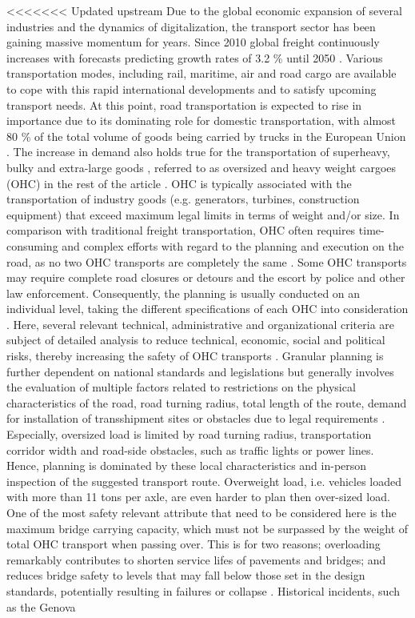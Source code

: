 
<<<<<<< Updated upstream
Due to the global economic expansion of several industries and the dynamics of digitalization, the transport sector has been gaining massive momentum for years. Since 2010 global freight continuously increases with forecasts predicting growth rates of 3.2 \% until 2050 \cite{figura2020preferences, InternationalTransportForum}. Various transportation modes, including rail, maritime, air and road cargo are available to cope with this rapid international developments and to satisfy upcoming transport needs. At this point, road transportation is expected to rise in importance due to its dominating role for domestic transportation, with almost 80 \% of the total volume of goods being carried by trucks in the European Union \cite{Eurostat}. The increase in demand also holds true for the transportation of superheavy, bulky and extra-large goods \cite{gavrilova2021analysis}, referred to as oversized and heavy weight cargoes (OHC) in the rest of the article \cite{Luo.2021}. OHC is typically associated with the transportation of industry goods (e.g. generators, turbines, construction equipment) that exceed maximum legal limits in terms of weight and/or size. In comparison with traditional freight transportation, OHC often requires time-consuming and complex efforts with regard to the planning and execution on the road, as no two OHC transports are completely the same \cite{Wolnowska.2019}. Some OHC transports may require complete road closures or detours and the escort by police and other law enforcement. Consequently, the planning is usually conducted on an individual level, taking the different specifications of each OHC into consideration \cite{Bazaras.2013}. Here, several relevant technical, administrative and organizational criteria are subject of detailed analysis to reduce technical, economic, social and political risks, thereby increasing the safety of OHC transports \cite{Palsaitis.2012}. Granular planning is further dependent on national standards and legislations but generally involves the evaluation of multiple factors related to restrictions on the physical characteristics of the road, road turning radius, total length of the route, demand for installation of transshipment sites or obstacles due to legal requirements \cite{PETRASKA.2018}. Especially, oversized load is limited by road turning radius, transportation corridor width and road-side obstacles, such as traffic lights or power lines. Hence, planning is dominated by these local characteristics and in-person inspection of the suggested transport route. Overweight load, i.e. vehicles loaded with more than 11 tons per axle, are even harder to plan then over-sized load. One of the most safety relevant attribute that need to be considered here is the maximum bridge carrying capacity, which must not be surpassed by the weight of total OHC transport when passing over. This is for two reasons; overloading remarkably contributes to shorten service lifes of pavements and bridges; and reduces bridge safety to levels that may fall below those set in the design standards, potentially resulting in failures or collapse \cite{fiorillo2018fragility}. Historical incidents, such as the Genova 